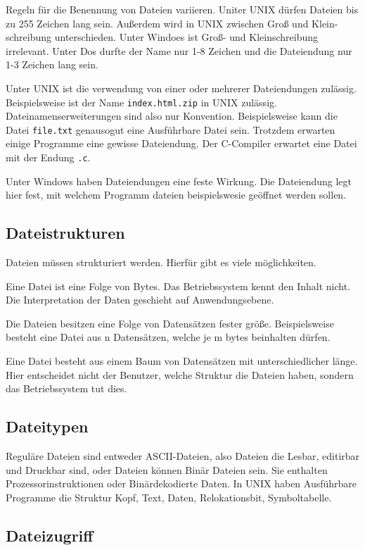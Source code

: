 Regeln für die Benennung von Dateien variieren. Uniter UNIX dürfen Dateien bis
zu 255 Zeichen lang sein. Außerdem wird in UNIX zwischen Groß und
Klein-schreibung unterschieden. Unter Windoes ist Groß- und Kleinschreibung
irrelevant. Unter Dos durfte der Name nur 1-8 Zeichen und die Dateiendung nur
1-3 Zeichen lang sein.

Unter UNIX ist die verwendung von einer oder mehrerer Dateiendungen zulässig.
Beispielsweise ist der Name \texttt{index.html.zip} in UNIX zulässig.
Datei\-namens\-er\-weiterungen sind also nur Konvention. Beispielsweise kann
die Datei \texttt{file.txt} genausogut eine Ausführbare Datei sein. Trotzdem
erwarten einige Programme eine gewisse Dateiendung. Der C-Compiler erwartet
eine Datei mit der Endung \texttt{.c}.

Unter Windows haben Dateiendungen eine feste Wirkung. Die Dateiendung legt hier
fest, mit welchem Programm dateien beispielswesie geöffnet werden sollen.

\subsection{Dateistrukturen}

Dateien müssen strukturiert werden. Hierfür gibt es viele möglichkeiten.

Eine Datei ist eine Folge von Bytes. Das Betriebssystem kennt den Inhalt nicht.
Die Interpretation der Daten geschieht auf Anwendungsebene.

Die Dateien besitzen eine Folge von Datensätzen fester größe. Beispielsweise
besteht eine Datei aus n Datensätzen, welche je m bytes beinhalten dürfen.

Eine Datei besteht aus einem Baum von Datensätzen mit unterschiedlicher länge.
Hier entscheidet nicht der Benutzer, welche Struktur die Dateien haben, sondern
das Betriebssystem tut dies.

\subsection{Dateitypen}

Reguläre Dateien sind entweder ASCII-Dateien, also Dateien die Lesbar,
editirbar und Druckbar sind, oder Dateien können Binär Dateien sein. Sie
enthalten Prozessorinstruktionen oder Binärdekodierte Daten. In UNIX haben
Ausführbare Programme die Struktur Kopf, Text, Daten, Relokationsbit,
Symboltabelle.

\subsection{Dateizugriff}

